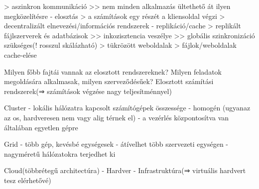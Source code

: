 \documentclass[12pt]{article}
\begin{document}
\begin{description}
                                                                        > aszinkron kommunikáció >> nem minden alkalmazás ültethető át ilyen megközelítésre
                                                                        - elosztás 
                                                                        > a számítások egy részét a kliensoldal végzi
                                                                        > decentralizált elnevezési/információs rendszerek
                                                                        - replikáció/cache
                                                                        > replikált fájlszerverek és adatbázisok >> inkozisztencia veszélye >> globális szinkronizáció szükséges(! rosszul skálázható)
                                                                        > tükrözött weboldalak
                                                                        > fájlok/weboldalak cache-elése
                                                                    \item  Milyen főbb fajtái vannak az elosztott rendszereknek? Milyen feladatok megoldására alkalmasak, milyen szerveződésűek?
                                                                        Elosztott számítási rendszerek(⇒ számítások végzése nagy teljesítménnyel)
                                                                    \item Cluster
                                                                        - lokális hálózatra kapcsolt számítógépek összessége 
                                                                        - homogén (ugyanaz az os, hardveresen nem vagy alig térnek el)
                                                                        - a vezérlés központosítva van általában egyetlen gépre
                                                                    \item Grid
                                                                        - több gép, kevésbé egységesek
                                                                        - átívelhet több szervezeti egységen 
                                                                        - nagyméretű hálózatokra terjedhet ki 
                                                                    \item Cloud(többrétegű architectúra)
                                                                        - Hardver
                                                                        - Infrastruktúra(⇒ virtuális hardvert tesz elérhetővé)

\end{description}
\end{document}
